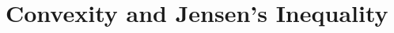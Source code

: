 \documentclass{subfile}
\begin{document}
	\section{Convexity and Jensen's Inequality}\label{sec:convexity}
\end{document}

